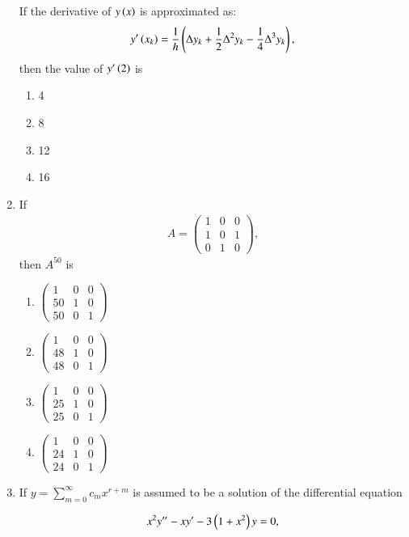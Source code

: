 \documentclass[journal]{IEEEtran}
\begin{document}
\begin{enumerate}
If the derivative of $y \left(x\right)$ is approximated as:
\begin{align*}
y^\prime \left(x_k\right) = \frac{1}{h} \left( \Delta y_k + \frac{1}{2} \Delta^2 y_k - \frac{1}{4} \Delta^3 y_k \right),
\end{align*}
then the value of $y^\prime \left(2\right)$ is

\begin{enumerate}
    \item 4
    \item 8
    \item 12
    \item 16
\end{enumerate}

\item If 
\begin{align*}
A = \begin{pmatrix}
1 & 0 & 0 \\
1 & 0 & 1 \\
0 & 1 & 0
\end{pmatrix},
\end{align*}
then $A^{50}$ is

\begin{enumerate}
    \item $\begin{pmatrix} 1 & 0 & 0 \\ 50 & 1 & 0 \\ 50 & 0 & 1 \end{pmatrix}$
    \item $\begin{pmatrix} 1 & 0 & 0 \\ 48 & 1 & 0 \\ 48 & 0 & 1 \end{pmatrix}$
    \item $\begin{pmatrix} 1 & 0 & 0 \\ 25 & 1 & 0 \\ 25 & 0 & 1 \end{pmatrix}$
    \item $\begin{pmatrix} 1 & 0 & 0 \\ 24 & 1 & 0 \\ 24 & 0 & 1 \end{pmatrix}$
\end{enumerate}
\item If $y = \sum_{m=0}^{\infty} c_m x^{r+m}$ is assumed to be a solution of the differential equation

	\begin{align*}
		x^2 y^{\prime \prime} - xy^{\prime} - 3 \left(1 + x^2\right) y = 0,
	\end{align*}


\end{enumerate}
\end{document}

